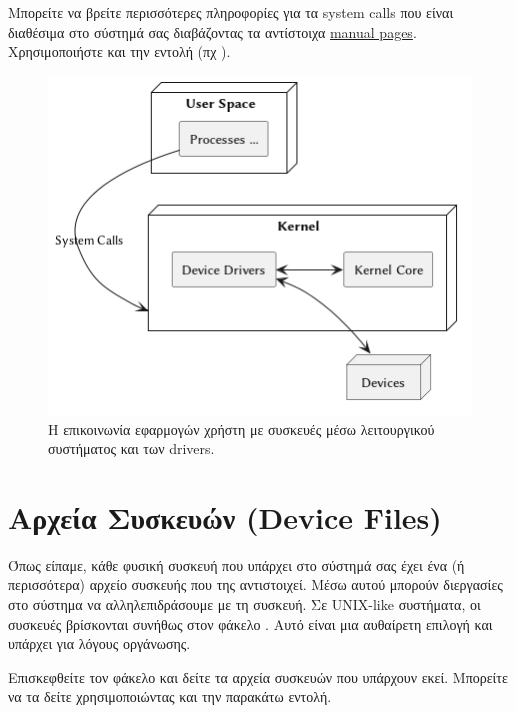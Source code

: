 \documentclass[18pt]{extarticle}
\begin{document}
\begin{info}[Σημείωση]
    Μπορείτε να βρείτε περισσότερες πληροφορίες για τα system calls που είναι διαθέσιμα στο σύστημά σας διαβάζοντας τα αντίστοιχα \href{https://man7.org/linux/man-pages/dir_section_2.html}{manual pages}.
    Χρησιμοποιήστε και την εντολή  (πχ ).
\end{info}

\begin{figure}[htpb]
    \centering
    \includegraphics[width=.7\textwidth]{assets/drivers.png}
    \caption{Η επικοινωνία εφαρμογών χρήστη με συσκευές μέσω λειτουργικού συστήματος και των drivers.}
    \label{fig:drivers}
\end{figure}





\section{Αρχεία Συσκευών (Device Files)}

Όπως είπαμε, κάθε φυσική συσκευή που υπάρχει στο σύστημά σας έχει ένα (ή περισσότερα) αρχείο συσκευής που της αντιστοιχεί. 
Μέσω αυτού μπορούν διεργασίες στο σύστημα να αλληλεπιδράσουμε με τη συσκευή.
Σε UNIX-like συστήματα, οι συσκευές βρίσκονται συνήθως στον φάκελο .
Αυτό είναι μια αυθαίρετη επιλογή και υπάρχει για λόγους οργάνωσης.

Επισκεφθείτε τον φάκελο  και δείτε τα αρχεία συσκευών που υπάρχουν εκεί. 
Μπορείτε να τα δείτε χρησιμοποιώντας και την παρακάτω εντολή.
\end{document}
